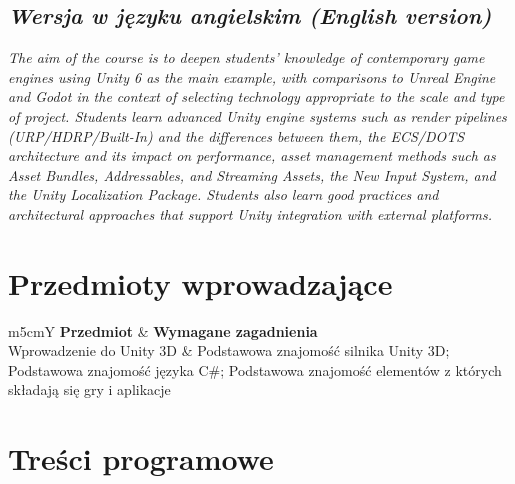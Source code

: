 \documentclass[12pt, a4paper]{article}
\newcommand{\thdrule}{\noalign{\global\setlength{\extrarowheight}{0pt}}}
\newcommand{\thdend}{\noalign{\global\setlength{\extrarowheight}{3pt}}}
\begin{document}
\subsection*{\textit{Wersja w języku angielskim (English version)}}

\textit{The aim of the course is to deepen students’ knowledge of contemporary game engines using Unity 6 as the main example, with comparisons to Unreal Engine and Godot in the context of selecting technology appropriate to the scale and type of project. Students learn advanced Unity engine systems such as render pipelines (URP/HDRP/Built-In) and the differences between them, the ECS/DOTS architecture and its impact on performance, asset management methods such as Asset Bundles, Addressables, and Streaming Assets, the New Input System, and the Unity Localization Package. Students also learn good practices and architectural approaches that support Unity integration with external platforms.}


\section{Przedmioty wprowadzające}

{\scriptsize
\begin{tabularx}{\textwidth}{m{5cm}Y}
\thdrule\toprule
{} {\color{white}\textbf{Przedmiot}} & {\color{white}\textbf{Wymagane zagadnienia}} \\
\midrule\thdend
   Wprowadzenie do Unity 3D & Podstawowa znajomość silnika Unity 3D; Podstawowa znajomość języka C\#; Podstawowa znajomość elementów z których składają się gry i aplikacje \\
\bottomrule
\end{tabularx}}

\section{Treści programowe}
\end{document}
